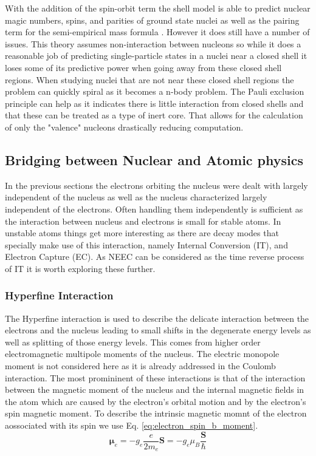 \documentclass[jon_ringuette_thesis.tex]{subfiles}
\begin{document}
    With the addition of the spin-orbit term the shell model is able to predict nuclear magic numbers, spins, and parities of ground state nuclei as well as the pairing term for the semi-empirical mass formula \cite{brmartin}. However it does still have a number of issues. This theory assumes non-interaction between nucleons so while it does a reasonable job of predicting single-particle states in a nuclei near a closed shell it loses some of its predictive power when going away from these closed shell regions. When studying nuclei that are not near these closed shell regions the problem can quickly spiral as it becomes a n-body problem. The Pauli exclusion principle can help as it indicates there is little interaction from closed shells and that these can be treated as a type of inert core. That allows for the calculation of only the "valence" nucleons drastically reducing computation.



    \subsection{Bridging between Nuclear and Atomic physics}
    In the previous sections the electrons orbiting the nucleus were dealt with largely independent of the nucleus as well as the nucleus characterized largely independent of the electrons. Often handling them independently is sufficient as the interaction between nucleus and electrons is small for stable atoms. In unstable atoms things get more interesting as there are decay modes that specially make use of this interaction, namely Internal Conversion (IT), and Electron Capture (EC). As NEEC can be considered as the time reverse process of IT it is worth exploring these further.

    \subsubsection{Hyperfine Interaction}
    The Hyperfine interaction is used to describe the delicate interaction between the electrons and the nucleus leading to small shifts in the degenerate energy levels as well as splitting of those energy levels. This comes from higher order electromagnetic multipole moments of the nucleus. The electric monopole moment is not considered here as it is already addressed in the Coulomb interaction. The most promininent of these interactions is that of the interaction between the magnetic moment of the nucleus and the internal magnetic fields in the atom which are caused by the electron's orbital motion and by the electron's spin magnetic moment. \cite{mcintyre}  To describe the intrinsic magnetic momnt of the electron aossociated with its spin we use Eq. \ref{eq:electron_spin_b_moment}.
    \begin{equation}
        \mathbf{\mu}_e = -g_e \frac{e}{2m_e}\mathbf{S} = -g_e \mu_{B} \frac{\mathbf{S}}{\hbar}
        \label{eq:electron_spin_b_moment}
    \end{equation}
\end{document}
